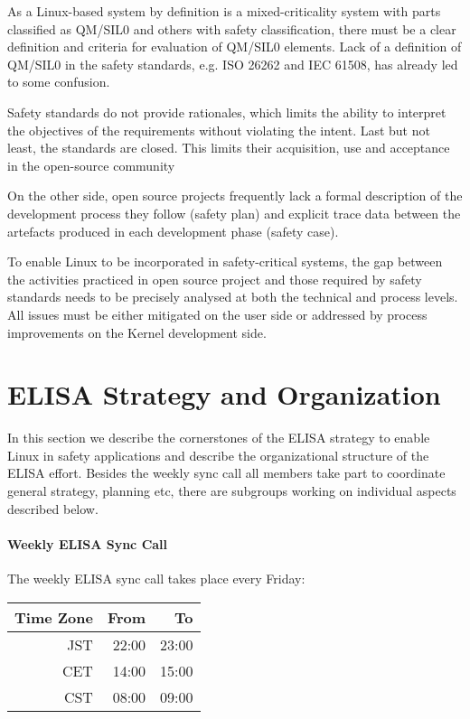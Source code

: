 \documentclass[12pt]{../Common_files/ElisaPaper}
\begin{document}
As a Linux-based system by definition is a mixed-criticality system with parts classified as QM/SIL0 and others with safety classification, there must be a clear definition and criteria for evaluation of QM/SIL0 elements.
Lack of a definition of QM/SIL0 in the safety standards, e.g. ISO 26262 and IEC 61508, has already led to some confusion.

Safety standards do not provide rationales, which limits the ability to interpret the objectives of the requirements without violating the intent.
Last but not least, the standards are closed.
This limits their acquisition, use and acceptance in the open-source community

On the other side, open source projects frequently lack a formal description of the development process they follow (safety plan) and explicit trace data between the artefacts produced in each development phase (safety case).

To enable Linux to be incorporated in safety-critical systems, the gap between the activities practiced in open source project and those required by safety standards needs to be precisely analysed at both the technical and process levels.
All issues must be either mitigated on the user side or addressed by process improvements on the Kernel development side.

\section{ELISA Strategy and Organization}
In this section we describe the cornerstones of the ELISA strategy to enable Linux in safety applications and describe the organizational structure of the ELISA effort.
Besides the weekly sync call all members take part to coordinate general strategy, planning etc, there are subgroups working on individual aspects described below.
\paragraph{Weekly ELISA Sync Call}
The weekly ELISA sync call takes place every Friday:
\begin{center}
	\begin{tabular}{rrr}
		\toprule
		Time Zone & From & To\\
		\midrule
		JST & 22:00 & 23:00 \\
		CET	& 14:00 & 15:00 \\
		CST & 08:00 & 09:00 \\
		\bottomrule
	\end{tabular} 
\end{center}
\end{document}
